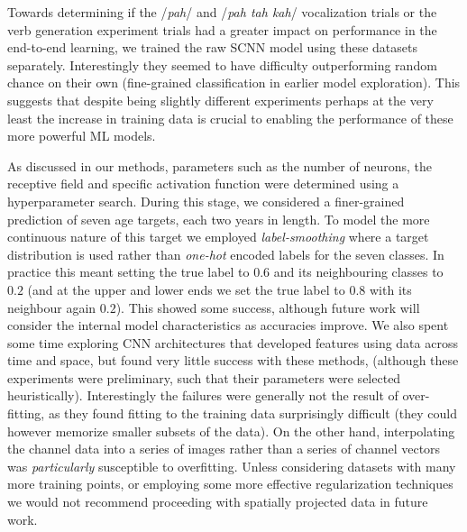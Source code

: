 \documentclass[fleqn,10pt]{wlscirep}
\begin{document}
Towards determining if the /{\em pah}/ and /{\em pah tah kah}/ vocalization trials or the verb generation experiment trials had a greater impact on performance in the end-to-end learning, we trained the raw SCNN model using these datasets separately. Interestingly they seemed to have difficulty outperforming random chance on their own (fine-grained classification in earlier model exploration). This suggests that despite being slightly different experiments perhaps at the very least the increase in training data is crucial to enabling the performance of these more powerful ML models.

As discussed in our methods, parameters such as the number of neurons, the receptive field and specific activation function were determined using a hyperparameter search. During this stage, we considered a finer-grained prediction of seven age targets, each two years in length. To model the more continuous nature of this target we employed {\em label-smoothing} \cite{Pereyra2017} where a target distribution is used rather than {\em one-hot} encoded labels for the seven classes. In practice this meant setting the true label to $0.6$ and its neighbouring classes to $0.2$ (and at the upper and lower ends we set the true label to $0.8$ with its neighbour again $0.2$). This showed some success, although future work will consider the internal model characteristics as accuracies improve. We also spent some time exploring CNN architectures that developed features using data across time and space, but found very little success with these methods, (although these experiments were preliminary, such that their parameters were selected heuristically). Interestingly the failures were generally not the result of over-fitting, as they found fitting to the training data surprisingly difficult (they could however memorize smaller subsets of the data). On the other hand, interpolating the channel data into a series of images rather than a series of channel vectors was {\em particularly} susceptible to overfitting. Unless considering datasets with many more training points, or employing some more effective regularization techniques we would not recommend proceeding with spatially projected data in future work. 
\end{document}
